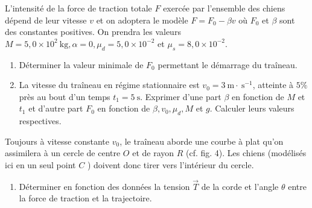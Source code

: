 L'intensité de la force de traction totale $F$ exercée par l'ensemble des chiens dépend de leur vitesse $v$ et on adoptera le modèle $F=F_0-\beta v$ où $F_0$ et $\beta$ sont des constantes positives. On prendra les valeurs $M=5,0 \times 10^2 \mathrm{~kg}, \alpha=0, \mu_d=5,0 \times 10^{-2}$ et $\mu_s=8,0 \times 10^{-2}$.

\begin{enumerate}[resume]
\item \facile Déterminer la valeur minimale de $F_0$ permettant le démarrage du traîneau.
\item \facile La vitesse du traîneau en régime stationnaire est $v_0=3 \mathrm{~m} \cdot \mathrm{~s}^{-1}$, atteinte à $5 \%$ près au bout d'un temps $t_1=5 \mathrm{~s}$. Exprimer d'une part $\beta$ en fonction de $M$ et $t_1$ et d'autre part $F_0$ en fonction de $\beta, v_0, \mu_d, M$ et $g$. Calculer leurs valeurs respectives.
\end{enumerate}


\begin{figure}[h]
\begin{center}
\end{center}
\end{figure}

Toujours à vitesse constante $v_0$, le traîneau aborde une courbe à plat qu'on assimilera à un cercle de centre $O$ et de rayon $R$ (cf. fig. 4). Les chiens (modélisés ici en un seul point $C$ ) doivent donc tirer vers l'intérieur du cercle.


\begin{enumerate}[resume]
\item \moyen Déterminer en fonction des données la tension $\vec{T}$ de la corde et l'angle $\theta$ entre la force de traction et la trajectoire.
\end{enumerate}




